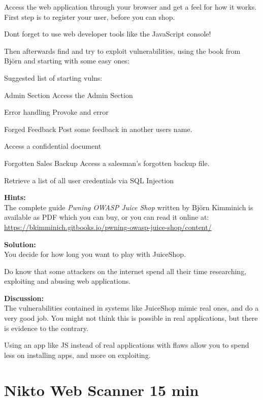 \documentclass[a4paper,11pt,notitlepage]{report}
\begin{document}
Access the web application through your browser and get a feel for how it works. First step is to register your user, before you can shop.

Dont forget to use web developer tools like the JavaScript console!

Then afterwards find and try to exploit vulnerabilities, using the book from Björn and starting with some easy ones:

Suggested list of starting vulns:
\begin{list2}
\item Admin Section Access the Admin Section
\item Error handling Provoke and error
\item Forged Feedback Post some feedback in another users name.
\item Access a confidential document
\item Forgotten Sales Backup Access a salesman's forgotten backup file.
\item Retrieve a list of all user credentials via SQL Injection
\end{list2}


 {\bf Hints:}\\
 The complete guide \emph{Pwning OWASP Juice Shop}
written by Björn Kimminich is available as PDF which you can buy, or you can read it online at:\\
\url{https://bkimminich.gitbooks.io/pwning-owasp-juice-shop/content/}

 {\bf Solution:}\\
 You decide for how long you want to play with JuiceShop.

 Do know that some attackers on the internet spend all their time researching, exploiting and abusing web applications.

 {\bf Discussion:}\\
The vulnerabilities contained in systems like JuiceShop mimic real ones, and do a very good job. You might not think this is possible in real applications, but there is evidence to the contrary.

Using an app like JS instead of real applications with flaws allow you to spend less on installing apps, and more on exploiting.




\chapter{Nikto Web Scanner 15 min}
\label{ex:nikto-webscanner}
\end{document}
